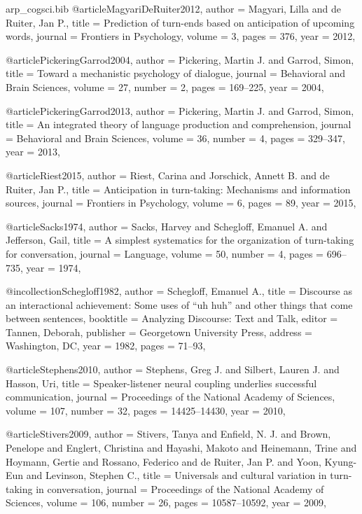 \begin{filecontents*}[overwrite]{arp_cogsci.bib}
@article{MagyariDeRuiter2012,
  author  = {Magyari, Lilla and de Ruiter, Jan P.},
  title   = {Prediction of turn-ends based on anticipation of upcoming words},
  journal = {Frontiers in Psychology},
  volume  = {3},
  pages   = {376},
  year    = {2012},
}

@article{PickeringGarrod2004,
  author  = {Pickering, Martin J. and Garrod, Simon},
  title   = {Toward a mechanistic psychology of dialogue},
  journal = {Behavioral and Brain Sciences},
  volume  = {27},
  number  = {2},
  pages   = {169--225},
  year    = {2004},
}

@article{PickeringGarrod2013,
  author  = {Pickering, Martin J. and Garrod, Simon},
  title   = {An integrated theory of language production and comprehension},
  journal = {Behavioral and Brain Sciences},
  volume  = {36},
  number  = {4},
  pages   = {329--347},
  year    = {2013},
}

@article{Riest2015,
  author  = {Riest, Carina and Jorschick, Annett B. and de Ruiter, Jan P.},
  title   = {Anticipation in turn-taking: Mechanisms and information sources},
  journal = {Frontiers in Psychology},
  volume  = {6},
  pages   = {89},
  year    = {2015},
}

@article{Sacks1974,
  author  = {Sacks, Harvey and Schegloff, Emanuel A. and Jefferson, Gail},
  title   = {A simplest systematics for the organization of turn-taking for conversation},
  journal = {Language},
  volume  = {50},
  number  = {4},
  pages   = {696--735},
  year    = {1974},
}

@incollection{Schegloff1982,
  author    = {Schegloff, Emanuel A.},
  title     = {Discourse as an interactional achievement: Some uses of ``uh huh'' and other things that come between sentences},
  booktitle = {Analyzing Discourse: Text and Talk},
  editor    = {Tannen, Deborah},
  publisher = {Georgetown University Press},
  address   = {Washington, DC},
  year      = {1982},
  pages     = {71--93},
}

@article{Stephens2010,
  author  = {Stephens, Greg J. and Silbert, Lauren J. and Hasson, Uri},
  title   = {Speaker-listener neural coupling underlies successful communication},
  journal = {Proceedings of the National Academy of Sciences},
  volume  = {107},
  number  = {32},
  pages   = {14425--14430},
  year    = {2010},
}

@article{Stivers2009,
  author  = {Stivers, Tanya and Enfield, N. J. and Brown, Penelope and Englert, Christina and Hayashi, Makoto and Heinemann, Trine and Hoymann, Gertie and Rossano, Federico and de Ruiter, Jan P. and Yoon, Kyung-Eun and Levinson, Stephen C.},
  title   = {Universals and cultural variation in turn-taking in conversation},
  journal = {Proceedings of the National Academy of Sciences},
  volume  = {106},
  number  = {26},
  pages   = {10587--10592},
  year    = {2009},
}


\end{filecontents*}
